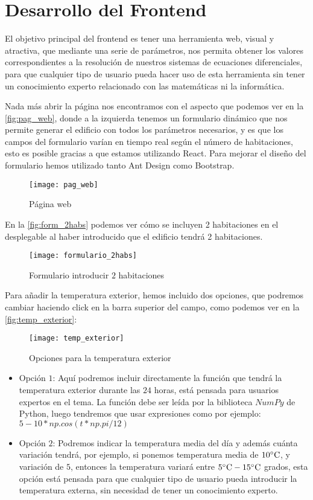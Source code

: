 \section{Desarrollo del Frontend}
El objetivo principal del frontend es tener una herramienta web, visual y atractiva, que mediante una serie de parámetros, nos permita obtener los valores correspondientes a la resolución de nuestros sistemas de ecuaciones diferenciales, para que cualquier tipo de usuario pueda hacer uso de esta herramienta sin tener un conocimiento experto relacionado con las matemáticas ni la informática.

Nada más abrir la página nos encontramos con el aspecto que podemos ver en la \autoref{fig:pag_web}, donde a la izquierda tenemos un formulario dinámico que nos permite generar el edificio con todos los parámetros necesarios, y es que los campos del formulario varían en tiempo real según el número de habitaciones, esto es posible gracias a que estamos utilizando React. Para mejorar el diseño del formulario hemos utilizado tanto Ant Design como Bootstrap.
\begin{figure}[h!]
	\centering
	\texttt{[image: pag\_web]}
	\caption{Página web}
	\label{fig:pag_web}
\end{figure}
En la \autoref{fig:form_2habs} podemos ver cómo se incluyen 2 habitaciones en el desplegable al haber introducido que el edificio tendrá 2 habitaciones.
\begin{figure}[h!]
	\centering
	\texttt{[image: formulario\_2habs]}
	\caption{Formulario introducir $2$ habitaciones}
	\label{fig:form_2habs}
\end{figure}
Para añadir la temperatura exterior, hemos incluido dos opciones, que podremos cambiar haciendo click en la barra superior del campo, como podemos ver en la \autoref{fig:temp_exterior}:
\begin{figure}[h!]
	\centering
	\texttt{[image: temp\_exterior]}
	\caption{Opciones para la temperatura exterior}
	\label{fig:temp_exterior}
\end{figure}
\begin{itemize}
	\item Opción $1$: Aquí podremos incluir directamente la función que tendrá la temperatura exterior durante las $24$ horas, está pensada para usuarios expertos en el tema. La función debe ser leída por la biblioteca $NumPy$ de Python, luego tendremos que usar expresiones como por ejemplo: $5 - 10*np.cos(t*np.pi/12)$
	\item Opción $2$: Podremos indicar la temperatura media del día y además cuánta variación tendrá, por ejemplo, si ponemos temperatura media de $10 \celsius$, y variación de $5$, entonces la temperatura variará entre $5 \celsius -15 \celsius$ grados, esta opción está pensada para que cualquier tipo de usuario pueda introducir la temperatura externa, sin necesidad de tener un conocimiento experto.
\end{itemize}
